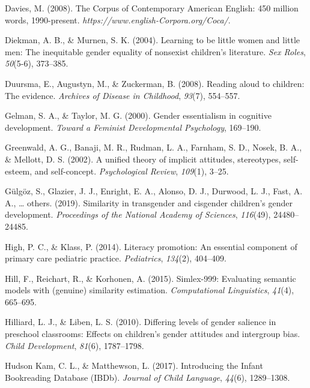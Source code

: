 \documentclass[
  english,
  ,man,floatsintext]{apa6}
\begin{document}
\leavevmode\hypertarget{ref-davies2008corpus}{}%
Davies, M. (2008). The Corpus of Contemporary American English: 450 million words, 1990-present. \emph{https://www.english-Corpora.org/Coca/}.

\leavevmode\hypertarget{ref-diekman2004learning}{}%
Diekman, A. B., \& Murnen, S. K. (2004). Learning to be little women and little men: The inequitable gender equality of nonsexist children's literature. \emph{Sex Roles}, \emph{50}(5-6), 373--385.

\leavevmode\hypertarget{ref-duursma2008reading}{}%
Duursma, E., Augustyn, M., \& Zuckerman, B. (2008). Reading aloud to children: The evidence. \emph{Archives of Disease in Childhood}, \emph{93}(7), 554--557.

\leavevmode\hypertarget{ref-gelman2000gender}{}%
Gelman, S. A., \& Taylor, M. G. (2000). Gender essentialism in cognitive development. \emph{Toward a Feminist Developmental Psychology}, 169--190.

\leavevmode\hypertarget{ref-greenwald2002unified}{}%
Greenwald, A. G., Banaji, M. R., Rudman, L. A., Farnham, S. D., Nosek, B. A., \& Mellott, D. S. (2002). A unified theory of implicit attitudes, stereotypes, self-esteem, and self-concept. \emph{Psychological Review}, \emph{109}(1), 3--25.

\leavevmode\hypertarget{ref-gulgoz2019similarity}{}%
Gülgöz, S., Glazier, J. J., Enright, E. A., Alonso, D. J., Durwood, L. J., Fast, A. A., \ldots{} others. (2019). Similarity in transgender and cisgender children's gender development. \emph{Proceedings of the National Academy of Sciences}, \emph{116}(49), 24480--24485.

\leavevmode\hypertarget{ref-high2014literacy}{}%
High, P. C., \& Klass, P. (2014). Literacy promotion: An essential component of primary care pediatric practice. \emph{Pediatrics}, \emph{134}(2), 404--409.

\leavevmode\hypertarget{ref-hill2015simlex}{}%
Hill, F., Reichart, R., \& Korhonen, A. (2015). Simlex-999: Evaluating semantic models with (genuine) similarity estimation. \emph{Computational Linguistics}, \emph{41}(4), 665--695.

\leavevmode\hypertarget{ref-hilliard2010differing}{}%
Hilliard, L. J., \& Liben, L. S. (2010). Differing levels of gender salience in preschool classrooms: Effects on children's gender attitudes and intergroup bias. \emph{Child Development}, \emph{81}(6), 1787--1798.

\leavevmode\hypertarget{ref-kam_2017}{}%
Hudson Kam, C. L., \& Matthewson, L. (2017). Introducing the Infant Bookreading Database (IBDb). \emph{Journal of Child Language}, \emph{44}(6), 1289--1308.
\end{document}

